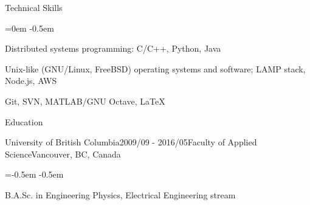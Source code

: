\documentclass{resume} %
\begin{document}
\begin{rSection}{Technical Skills}
\begin{list}{}{\leftmargin=0em} %
\itemsep -0.5em %
\item Distributed systems programming: C/C++, Python, Java
\item Unix-like (GNU/Linux, FreeBSD) operating systems and software; LAMP stack, Node.js, AWS
\item Git, SVN, MATLAB/GNU Octave, LaTeX
\end{list}
\end{rSection}





\begin{rSection}{Education}
\begin{rSubsection}{University of British Columbia}{2009/09 - 2016/05}{Faculty of Applied Science}{Vancouver, BC, Canada}
\item
\begin{list}{}{\leftmargin=-0.5em} %
\itemsep -0.5em %
\item B.A.Sc. in Engineering Physics, Electrical Engineering stream
\end{list}
\end{rSubsection}

\end{rSection}




\end{document}
